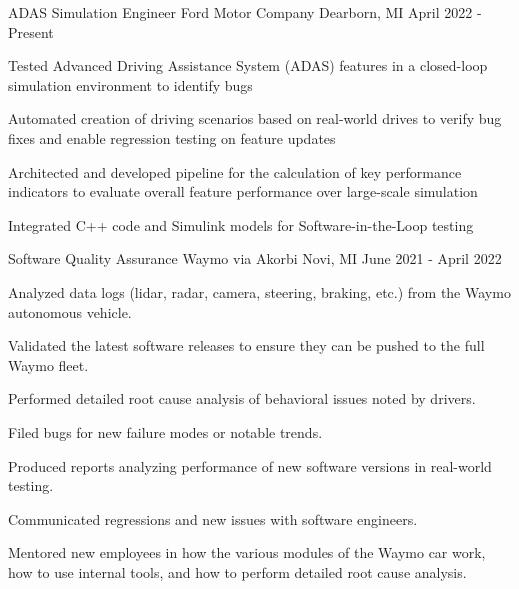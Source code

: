 
\begin{cventries}
  \cventry
    {ADAS Simulation Engineer}
    {Ford Motor Company}
    {Dearborn, MI}
    {April 2022 - Present}
    {
       \begin{cvitems}
            \item {Tested Advanced Driving Assistance System (ADAS) features in a closed-loop simulation environment to identify bugs}
            \item {Automated creation of driving scenarios based on real-world drives to verify bug fixes and enable regression testing on feature updates}
            \item {Architected and developed pipeline for the calculation of key performance indicators to evaluate overall feature performance over large-scale simulation}
            \item {Integrated C++ code and Simulink models for Software-in-the-Loop testing}
       \end{cvitems}
    }
    
  \cventry
    {Software Quality Assurance} %
    {Waymo via Akorbi} %
    {Novi, MI} %
    {June 2021 - April 2022} %
    {
      \begin{cvitems} %
        \item {Analyzed data logs (lidar, radar, camera, steering, braking, etc.) from the Waymo autonomous vehicle.}
        \item {Validated the latest software releases to ensure they can be pushed to the full Waymo fleet.}
        \item {Performed detailed root cause analysis of behavioral issues noted by drivers.}
        \item {Filed bugs for new failure modes or notable trends.}
        \item {Produced reports analyzing performance of new software versions in real-world testing.}
        \item {Communicated regressions and new issues with software engineers.}
        \item {Mentored new employees in how the various modules of the Waymo car work, how to use internal tools, and how to perform detailed root cause analysis.}
      \end{cvitems}
    }
\end{cventries}